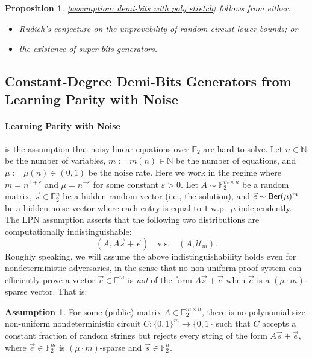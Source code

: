 \documentclass[10pt,a4paper]{article}
\newtheorem{proposition}[theorem]{Proposition}
\theoremstyle{definition}
\newtheorem{assumption}[theorem]{Assumption}
\theoremstyle{remark}
\newcommand{\eps}{\varepsilon}
\newcommand{\calU}{\mathcal{U}}
\newcommand{\N}{\mathbb{N}}
\newcommand{\F}{\mathbb{F}}
\begin{document}
\begin{proposition}
    \autoref{assumption: demi-bits with poly stretch} follows from either:\begin{itemize}
        \item Rudich's conjecture on the unprovability of random circuit lower bounds; or
        \item the existence of super-bits generators.
    \end{itemize}
\end{proposition}




\subsection{Constant-Degree Demi-Bits Generators from Learning Parity with Noise}

\paragraph{Learning Parity with Noise} is the assumption that noisy linear equations over $\F_2$ are hard to solve. Let $n\in \N$ be the number of variables, $m := m(n)\in \N$ be the number of equations, and $\mu := \mu(n) \in (0, 1)$ be the noise rate. Here we work in the regime where $m = n^{1+\eps}$ and $\mu = n^{-\eps}$ for some constant $\eps > 0$. Let $A \sim \F_2^{m\times n}$ be a random matrix, $\vec{s}\in \F_2^n$ be a hidden random vector (i.e., the solution), and $\vec{e}\sim {\sf Ber}(\mu)^m$ be a hidden noise vector where each entry is equal to $1$ w.p.~$\mu$ independently. The LPN assumption asserts that the following two distributions are computationally indistinguishable:
\[(A, A\vec{s} + \vec{e})\quad\text{v.s.}\quad (A, \calU_m).\]
Roughly speaking, we will assume the above indistinguishability holds even for nondeterministic adversaries, in the sense that no non-uniform proof system can efficiently prove a vector $\vec{v} \in \F^m$ is \emph{not} of the form $A\vec{s} + \vec{e}$ when $\vec{e}$ is a $(\mu\cdot m)$-sparse vector. That is:

\begin{assumption}\label{assumption: demi-hardness of LPN}
    For some (public) matrix $A\in \F_2^{m\times n}$, there is no polynomial-size non-uniform nondeterministic circuit $C: \{0, 1\}^m \to \{0, 1\}$ such that $C$ accepts a constant fraction of random strings but rejects every string of the form $A\vec{s} + \vec{e}$, where $\vec{e} \in \F_2^m$ is $(\mu\cdot m)$-sparse and $\vec{s} \in \F_2^n$.
\end{assumption}
\end{document}
